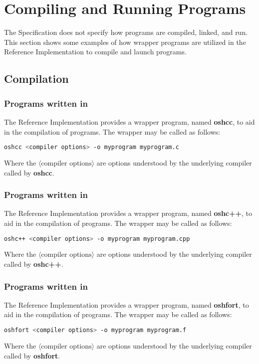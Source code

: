 \chapter{Compiling and Running Programs}\label{sec:compiling}
The \openshmem Specification does not specify how
\openshmem programs are compiled, linked, and run. This section shows some
examples of how wrapper programs are utilized in the \openshmem Reference
Implementation to compile and launch programs.

\section{Compilation}
\subsection*{Programs written in \Cstd}

The \openshmem Reference Implementation provides a wrapper program, named
\textbf{oshcc}, to aid in the compilation of \Cstd programs.
The wrapper may be called as follows:

\begin{lstlisting}[language=bash]
oshcc <compiler options> -o myprogram myprogram.c
\end{lstlisting}
Where the $\langle\mbox{compiler options}\rangle$ are options understood by the
underlying \Cstd compiler called by \textbf{oshcc}.


\subsection*{Programs written in \Cpp}

The \openshmem Reference Implementation provides a wrapper program, named
\textbf{oshc++}, to aid in the compilation of \Cpp programs.
The wrapper may be called as follows:

\begin{lstlisting}[language=bash]
oshc++ <compiler options> -o myprogram myprogram.cpp
\end{lstlisting}
Where the $\langle\mbox{compiler options}\rangle$ are options understood by the
underlying \Cpp compiler called by \textbf{oshc++}.


\subsection*{Programs written in \Fortran}

\begin{deprecate}
The \openshmem Reference Implementation provides a wrapper program, named
\textbf{oshfort}, to aid in the compilation of \Fortran programs.
The wrapper may be called as follows:

\begin{lstlisting}[language=bash]
oshfort <compiler options> -o myprogram myprogram.f
\end{lstlisting}
Where the $\langle\mbox{compiler options}\rangle$ are options understood by the
underlying \Fortran compiler called by \textbf{oshfort}.
\end{deprecate}

